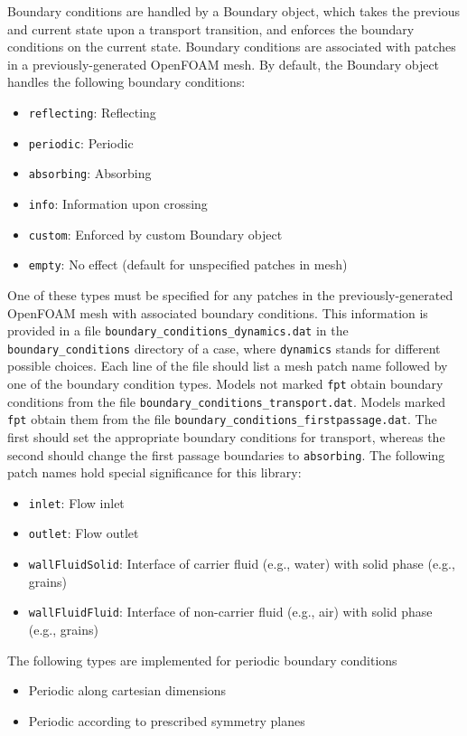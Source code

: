 \documentclass[11pt]{article}
\begin{document}
Boundary conditions are handled by a Boundary object, which takes the previous and current state upon a transport transition, and enforces the boundary conditions on the current state. Boundary conditions are associated with patches in a previously-generated OpenFOAM mesh.
By default, the Boundary object handles the following boundary conditions:
%
\begin{itemize}
\item \lstinline{reflecting}: Reflecting
\item \lstinline{periodic}: Periodic
\item \lstinline{absorbing}: Absorbing
\item \lstinline{info}: Information upon crossing
\item \lstinline{custom}: Enforced by custom Boundary object
\item \lstinline{empty}: No effect (default for unspecified patches in mesh)
\end{itemize}
One of these types must be specified for any patches in the previously-generated OpenFOAM mesh with associated boundary conditions. This information is provided in a file \lstinline{boundary_conditions_dynamics.dat} in the \lstinline{boundary_conditions} directory of a case, where \lstinline{dynamics} stands for different possible choices. Each line of the file should list a mesh patch name followed by one of the boundary condition types. Models not marked \lstinline{fpt} obtain boundary conditions from the file \lstinline{boundary_conditions_transport.dat}. Models marked \lstinline{fpt} obtain them from the file \lstinline{boundary_conditions_firstpassage.dat}. The first should set the appropriate boundary conditions for transport, whereas the second should change the first passage boundaries to \lstinline{absorbing}. The following patch names hold special significance for this library:
%
\begin{itemize}
\item \lstinline{inlet}: Flow inlet
\item \lstinline{outlet}: Flow outlet
\item \lstinline{wallFluidSolid}: Interface of carrier fluid (e.g., water) with solid phase (e.g., grains)
\item \lstinline{wallFluidFluid}: Interface of non-carrier fluid (e.g., air) with solid phase (e.g., grains)
\end{itemize}
The following types are implemented for periodic boundary conditions
%
\begin{itemize}
\item Periodic along cartesian dimensions
\item Periodic according to prescribed symmetry planes
\end{itemize}
\end{document}

